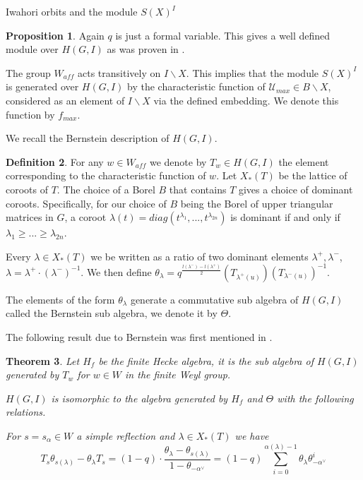 \documentclass[12pt]{article}
\newcommand{\<}{\langle}
\renewcommand{\>}{\rangle}
\theoremstyle{plain}
\newtheorem{theorem}{Theorem}[section]
\theoremstyle{definition}
\newtheorem{prop}[theorem]{Proposition}
\newtheorem{defn}[theorem]{Definition}
\begin{document}
\begin{section}{Iwahori orbits and the module $S(X)^I$}
\begin{prop}
Again $q$ is just a formal variable. This gives a well defined module over $H(G,I)$ as was proven in \cite{my}.
   
\end{prop}


The group $W_{aff}$ acts transitively on $I\backslash X$. This implies that the module $S(X)^I$ is generated over $H(G,I)$ by the characteristic function of $\mathcal{U}_{max}\in B\backslash X$, considered as an element of $I\backslash X$ via the defined embedding. We denote this function by $f_{max}$.

We recall the Bernstein description of $H(G,I)$.

\begin{defn}
    For any $w\in W_{aff}$ we denote by $T_w\in H(G,I)$ the element corresponding to the characteristic function of $w$. 
    Let $X_*(T)$ be the lattice of coroots of $T$.
    The choice of a Borel $B$ that contains $T$ gives a choice of dominant coroots. Specifically, for our choice of $B$ being the Borel of upper triangular matrices in $G$, a coroot $\lambda(t)=diag(t^{\lambda_1},..., t^{\lambda_{2n}})$ is dominant if and only if $\lambda_1\geq ...\geq \lambda_{2n}$. 

    Every $\lambda\in X_*(T)$ we be written as a ratio of two dominant elements $\lambda^+,\lambda^-$, $\lambda=\lambda^+\cdot (\lambda^-)^{-1}$. We then define $\theta_\lambda=q^\frac{l(\lambda^-)-l(\lambda^+)}{2}(T_{\lambda^+(u)})(T_{\lambda^-(u)})^{-1}$.
\end{defn}

The elements of the form $\theta_\lambda$ generate a commutative sub algebra of $H(G,I)$ called the Bernstein sub algebra, we denote it by $\Theta$.

The following result due to Bernstein was first mentioned in \cite{Bernsteins_presentation}.

\begin{theorem}\label{Ber_presentation}
    Let $H_f$ be the finite Hecke algebra, it is the sub algebra of $H(G,I)$ generated by $T_w$ for $w\in W$ in the finite Weyl group. 

    $H(G,I)$ is isomorphic to the algebra generated by $H_f$ and $\Theta$ with the following relations.

    For $s=s_\alpha\in W$ a simple reflection and $\lambda\in X_*(T)$ we have $$T_s\theta_{s(\lambda)}-\theta_\lambda T_s=(1-q)\cdot \frac{\theta_\lambda-\theta_{s(\lambda)}}{1-\theta_{-\alpha^\vee}}=(1-q)\sum^{\alpha(\lambda)-1}_{i=0} \theta_\lambda\theta^i_{-\alpha^\vee}$$
\end{theorem}



\end{section}
\end{document}
